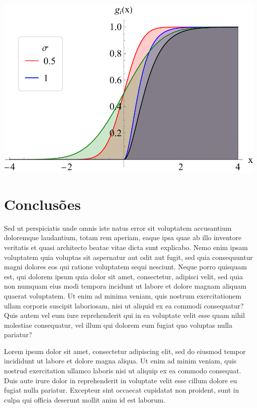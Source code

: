 \documentclass[a0,portrait]{a0poster}
\begin{document}
\begin{mdframed}[style=MyFrame]
\begin{multicols}{2}
\begin{minipage}{\columnwidth}
    \includegraphics[width=0.9\columnwidth]{figures/g}
\end{minipage}

\section{Conclusões}

Sed ut perspiciatis unde omnis iste natus error sit voluptatem accusantium doloremque laudantium, totam rem aperiam, eaque ipsa quae ab illo inventore veritatis et quasi architecto beatae vitae dicta sunt explicabo. Nemo enim ipsam voluptatem quia voluptas sit aspernatur aut odit aut fugit, sed quia consequuntur magni dolores eos qui ratione voluptatem sequi nesciunt. Neque porro quisquam est, qui dolorem ipsum quia dolor sit amet, consectetur, adipisci velit, sed quia non numquam eius modi tempora incidunt ut labore et dolore magnam aliquam quaerat voluptatem. Ut enim ad minima veniam, quis nostrum exercitationem ullam corporis suscipit laboriosam, nisi ut aliquid ex ea commodi consequatur? Quis autem vel eum iure reprehenderit qui in ea voluptate velit esse quam nihil molestiae consequatur, vel illum qui dolorem eum fugiat quo voluptas nulla pariatur?

Lorem ipsum dolor sit amet, consectetur adipiscing elit, sed do eiusmod tempor incididunt ut labore et dolore magna aliqua. Ut enim ad minim veniam, quis nostrud exercitation ullamco laboris nisi ut aliquip ex ea commodo consequat. Duis aute irure dolor in reprehenderit in voluptate velit esse cillum dolore eu fugiat nulla pariatur. Excepteur sint occaecat cupidatat non proident, sunt in culpa qui officia deserunt mollit anim id est laborum.


\end{multicols}
\end{mdframed}
\end{document}

